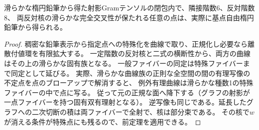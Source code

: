 \begin{corollary}[滑らかな反対核を保つ特殊化]\label{cor:smooth-apolar-specialization}
滑らかな楕円鉛筆から得た射影Gramテンソルの閉包内で、隣接階数6、反対階数8、
両反対核の滑らかな完全交叉性が保たれる任意の点は、実際に基点自由楕円鉛筆から得られる。
\end{corollary}
\begin{proof}
稠密な鉛筆表示から指定点への特殊化を曲線で取り、正規化し必要なら離散付値環を有限拡大する。
一定階数の反対核と二式の横断性から、両方の曲線はその上の滑らかな固有族となる。
一般ファイバーの同定は特殊ファイバーまで同定として延びる。
実際、滑らかな曲線族の正則な全空間の間の有理写像の不定点を点のブローアップで解消すると、
例外有理曲線は滑らかな種数1の特殊ファイバーの中で点に写る。
従って元の正規な面へ降下する（グラフの射影が一点ファイバーを持つ固有双有理射となる）。
逆写像も同じである。延長したグラフへの二次切断の積は両ファイバーで全射で、核は部分束である。
その核で$w$が消える条件が特殊点にも残るので、前定理を適用できる。
\end{proof}

